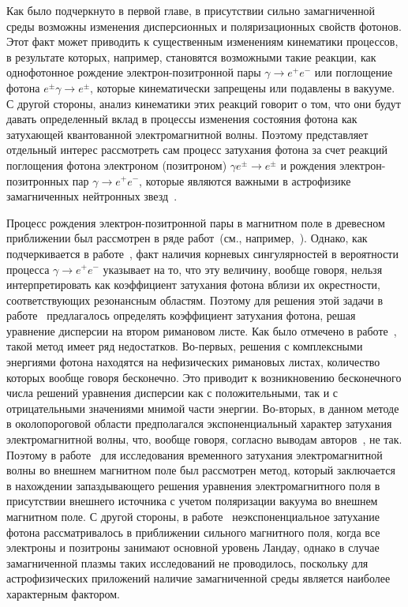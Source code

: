 Как было подчеркнуто в первой главе, в присутствии сильно замагниченной среды 
возможны изменения дисперсионных и поляризационных свойств фотонов. Этот факт 
может приводить к существенным изменениям кинематики процессов, в результате 
которых, например, становятся возможными такие реакции, как однофотонное 
рождение электрон-позитронной пары $\gamma\to e^+e^-$ или поглощение фотона 
$e^{\pm}\gamma\to e^{\pm}$, которые кинематически запрещены или подавлены в 
вакууме. С другой стороны, анализ кинематики этих реакций говорит о том, что 
они будут давать определенный вклад в процессы изменения состояния фотона как 
затухающей квантованной электромагнитной волны. Поэтому представляет отдельный 
интерес рассмотреть сам процесс затухания фотона за счет реакций поглощения 
фотона электроном (позитроном)
$\gamma e^{\pm} \to e^{\pm}$ и рождения электрон-позитронных пар $\gamma \to e^+ e^-$, которые являются важными в астрофизике замагниченных нейтронных звезд~\cite{Kostenko:2018,Philippov_2020}. 

Процесс рождения электрон-позитронной пары  в магнитном поле в древесном приближении был рассмотрен в ряде работ~(см., например,~\cite{Klepikov:1954,Sturrock:1971,Tademaru:1973,Daugherty:1983,Shabad:1988}). Однако, как подчеркивается в работе~\cite{Shabad:1988}, факт наличия корневых сингулярностей в вероятности процесса $\gamma\to e^+e^-$ указывает на то, что эту величину, вообще говоря, нельзя интерпретировать как коэффициент затухания фотона вблизи их окрестности, соответствующих резонансным областям. Поэтому для решения этой задачи в работе~\cite{Shabad:1988} предлагалось определять коэффициент затухания фотона, решая уравнение дисперсии на втором римановом листе.  Как было отмечено в работе~\cite{MikhChist:2001}, такой метод имеет ряд недостатков. Во-первых, решения с комплексными энергиями фотона находятся на нефизических римановых листах, количество которых вообще говоря бесконечно. Это приводит к возникновению бесконечного числа решений уравнения дисперсии как с положительными, так и с отрицательными значениями мнимой части энергии. Во-вторых, в данном методе в околопороговой области предполагался экспоненциальный характер затухания электромагнитной волны, что, вообще говоря, согласно выводам авторов~\cite{MikhChist:2001}, не так. Поэтому в работе~\cite{MikhChist:2001} для исследования временного затухания электромагнитной волны во внешнем магнитном поле был рассмотрен метод, который заключается в нахождении запаздывающего решения уравнения электромагнитного поля в присутствии внешнего источника с учетом поляризации вакуума во внешнем магнитном поле. С другой стороны, в работе~\cite{MikhChist:2001} неэкспоненциальное затухание фотона рассматривалось в приближении сильного магнитного поля, когда все электроны и позитроны занимают основной уровень Ландау, однако в случае замагниченной плазмы таких исследований не проводилось, поскольку для астрофизических приложений наличие замагниченной среды является наиболее характерным фактором.

